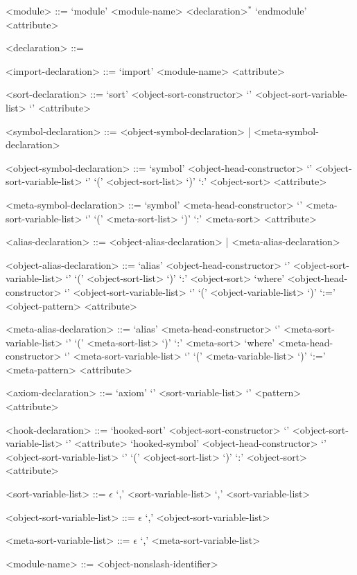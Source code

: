 \documentclass[UTF8,11pt]{article}
\theoremstyle{plain}
\theoremstyle{definition}
\theoremstyle{remark}
\begin{document}
\begin{grammar}\small

<module> ::= \quad
\alt `module' <module-name> <declaration>$^*$ 
`endmodule' <attribute>

<declaration> ::= \quad
{}

<import-declaration> ::= `import' <module-name> <attribute>

<sort-declaration> ::= `sort'
<object-sort-constructor>  `{' <object-sort-variable-list> `}' 
<attribute>

<symbol-declaration> ::= <object-symbol-declaration> | 
<meta-symbol-declaration>

<object-symbol-declaration> ::= \quad
\alt `symbol' <object-head-constructor> 
`{' <object-sort-variable-list> `}' 
`(' <object-sort-list> `)' `:' <object-sort> <attribute>

<meta-symbol-declaration> ::= \quad
\alt `symbol' <meta-head-constructor>
`{'	<meta-sort-variable-list> `}'
 `(' <meta-sort-list> `)' `:' <meta-sort> <attribute>

<alias-declaration> ::= <object-alias-declaration> | <meta-alias-declaration> 

<object-alias-declaration> ::= \quad
\alt `alias' <object-head-constructor> 
`{' <object-sort-variable-list> `}' 
`(' <object-sort-list> `)' `:' <object-sort> 
`where' 
<object-head-constructor> 
`{' <object-sort-variable-list> `}'
`(' <object-variable-list> `)' 
`:='
<object-pattern>
<attribute>

<meta-alias-declaration> ::= \quad
\alt `alias' <meta-head-constructor> 
`{'	<meta-sort-variable-list> `}'
`(' <meta-sort-list> `)' `:' <meta-sort> 
`where' 
<meta-head-constructor> 
`{' <meta-sort-variable-list> `}'
`(' <meta-variable-list> `)' 
`:='
<meta-pattern>
<attribute>

<axiom-declaration> ::= `axiom' `{' <sort-variable-list> `}' <pattern> 
<attribute>

<hook-declaration> ::= \quad
\alt `hooked-sort' <object-sort-constructor>  `{' <object-sort-variable-list> 
`}' <attribute>
\alt `hooked-symbol' <object-head-constructor> 
`{' <object-sort-variable-list> `}' 
`(' <object-sort-list> `)' `:' <object-sort> <attribute>

<sort-variable-list> ::= \quad
\alt $\epsilon$
 `,' <sort-variable-list>
 `,' <sort-variable-list>

<object-sort-variable-list> ::= \quad
\alt $\epsilon$
 `,' <object-sort-variable-list>

<meta-sort-variable-list> ::= \quad
\alt $\epsilon$
 `,' <meta-sort-variable-list>

<module-name> ::= <object-nonslash-identifier>
\end{grammar}
\end{document}

